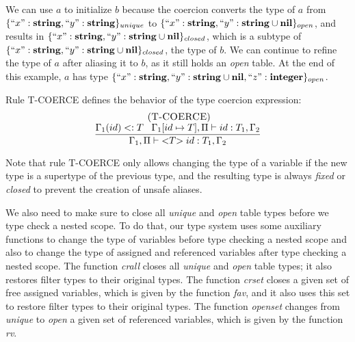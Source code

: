We can use $a$ to initialize $b$ because the coercion converts
the type of $a$ from $\{``x":\mathbf{string}, ``y":\mathbf{string}\}_{unique}$ to
$\{``x":\mathbf{string}, ``y":\mathbf{string} \cup \mathbf{nil}\}_{open}$, and results in
$\{``x":\mathbf{string}, ``y":\mathbf{string} \cup \mathbf{nil}\}_{closed}$,
which is a subtype of
$\{``x":\mathbf{string}, ``y":\mathbf{string} \cup \mathbf{nil}\}_{closed}$, the type of $b$.
We can continue to refine the type of $a$ after aliasing it to $b$,
as it still holds an \emph{open} table.
At the end of this example, $a$ has type
$\{``x":\mathbf{string}, ``y":\mathbf{string} \cup \mathbf{nil}, ``z":\mathbf{integer}\}_{open}$.

Rule \textsc{T-COERCE} defines the behavior of the type coercion expression:
\[
\begin{array}{c}
\; (\textsc{T-COERCE})\\
\dfrac{\Gamma_{1}(id) <: T \;\;\;
       \Gamma_{1}[id \mapsto T], \Pi \vdash id:T_{1}, \Gamma_{2}}
      {\Gamma_{1}, \Pi \vdash {<}T{>} \; id:T_{1}, \Gamma_{2}}
\end{array}
\]

Note that rule \textsc{T-COERCE} only allows changing the type
of a variable if the new type is a supertype of the previous type,
and the resulting type is always \emph{fixed} or \emph{closed}
to prevent the creation of unsafe aliases.

We also need to make sure to close all \emph{unique} and \emph{open}
table types before we type check a nested scope.
To do that, our type system uses some auxiliary functions to change
the type of variables before type checking a nested scope and
also to change the type of assigned and referenced variables after
type checking a nested scope.
The function \emph{crall} closes all \emph{unique} and \emph{open}
table types; it also restores filter types to their original types.
The function \emph{crset} closes a given set of free assigned variables,
which is given by the function \emph{fav}, and
it also uses this set to restore filter types to their original types.
The function \emph{openset} changes from \emph{unique} to \emph{open}
a given set of referenced variables, which is given by the function \emph{rv}.

